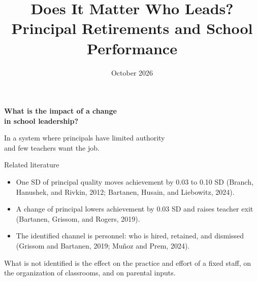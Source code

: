 \documentclass[aspectratio=169,11pt]{beamer}
\title{\textbf{Does It Matter Who Leads?}\\[0.5em]{\large Principal Retirements and School Performance}}
\author{}
\date{October 2026}
\newcommand{\cit}[1]{{\color{cite}\small(#1)}}
\begin{document}
\begin{frame}[plain]
\titlepage
\end{frame}

\begin{frame}[plain,c]
\vfill
\begin{center}
{\LARGE\textbf{What is the impact of a change}\\[0.25em]\textbf{in school leadership?}}
\end{center}
\vspace{0.5cm}
\begin{center}
{\large In a system where principals have limited authority\\[0.2em]and few teachers want the job.}
\end{center}
\vfill
\end{frame}

\begin{frame}{Related literature}
\vspace{0.4cm}
\begin{itemize}\setlength{\itemsep}{1.1em}
\item One SD of principal quality moves achievement by 0.03 to 0.10 SD \cit{Branch, Hanushek, and Rivkin, 2012; Bartanen, Husain, and Liebowitz, 2024}.
\item A change of principal lowers achievement by 0.03 SD and raises teacher exit \cit{Bartanen, Grissom, and Rogers, 2019}.
\item The identified channel is personnel: who is hired, retained, and dismissed \cit{Grissom and Bartanen, 2019; Mu\~noz and Prem, 2024}.
\end{itemize}
\vspace{0.9cm}
What is not identified is the effect on the practice and effort of a fixed staff, on the organization of classrooms, and on parental inputs.
\end{frame}
\end{document}
